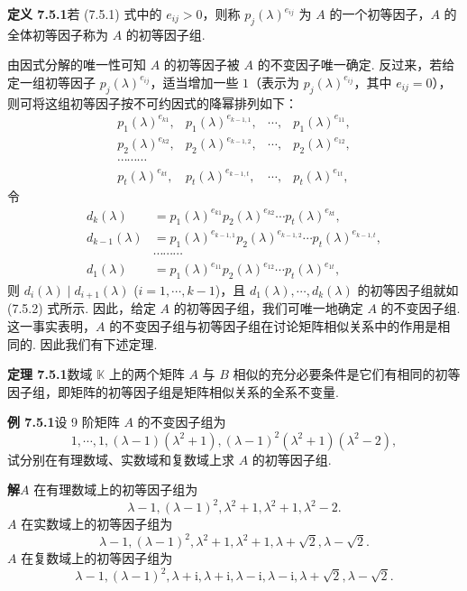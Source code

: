 \documentclass[UTF8,12pt,a4paper,fontset=fandol]{ctexart}
\begin{document}
\noindent\textbf{定义 7.5.1}\quad 若 (7.5.1) 式中的 $e_{ij}>0$，则称 $p_j(\lambda)^{e_{ij}}$ 为 $A$ 的一个初等因子，$A$ 的全体初等因子称为 $A$ 的初等因子组.

由因式分解的唯一性可知 $A$ 的初等因子被 $A$ 的不变因子唯一确定. 反过来，若给定一组初等因子 $p_j(\lambda)^{e_{ij}}$，适当增加一些 $1$（表示为 $p_j(\lambda)^{e_{ij}}$，其中 $e_{ij}=0$），则可将这组初等因子按不可约因式的降幂排列如下：
\begin{equation}
\begin{array}{cccc}
p_1(\lambda)^{e_{k1}}, & p_1(\lambda)^{e_{k-1,1}}, & \cdots, & p_1(\lambda)^{e_{11}},\\
p_2(\lambda)^{e_{k2}}, & p_2(\lambda)^{e_{k-1,2}}, & \cdots, & p_2(\lambda)^{e_{12}},\\
\cdots\cdots\cdots\\
p_t(\lambda)^{e_{kt}}, & p_t(\lambda)^{e_{k-1,t}}, & \cdots, & p_t(\lambda)^{e_{1t}},
\end{array}
\tag{7.5.2}
\end{equation}
令
\[
\begin{aligned}
d_k(\lambda)&=p_1(\lambda)^{e_{k1}}p_2(\lambda)^{e_{k2}}\cdots p_t(\lambda)^{e_{kt}},\\
d_{k-1}(\lambda)&=p_1(\lambda)^{e_{k-1,1}}p_2(\lambda)^{e_{k-1,2}}\cdots p_t(\lambda)^{e_{k-1,t}},\\
&\cdots\cdots\cdots\\
d_1(\lambda)&=p_1(\lambda)^{e_{11}}p_2(\lambda)^{e_{12}}\cdots p_t(\lambda)^{e_{1t}},
\end{aligned}
\]
则 $d_i(\lambda)\mid d_{i+1}(\lambda)$ ($i=1,\cdots,k-1$)，且 $d_1(\lambda),\cdots,d_k(\lambda)$ 的初等因子组就如 (7.5.2) 式所示. 因此，给定 $A$ 的初等因子组，我们可唯一地确定 $A$ 的不变因子组. 这一事实表明，$A$ 的不变因子组与初等因子组在讨论矩阵相似关系中的作用是相同的. 因此我们有下述定理.

\noindent\textbf{定理 7.5.1}\quad 数域 $\mathbb{K}$ 上的两个矩阵 $A$ 与 $B$ 相似的充分必要条件是它们有相同的初等因子组，即矩阵的初等因子组是矩阵相似关系的全系不变量.

\noindent\textbf{例 7.5.1}\quad 设 9 阶矩阵 $A$ 的不变因子组为
\[
1,\cdots,1,(\lambda-1)(\lambda^2+1),(\lambda-1)^2(\lambda^2+1)(\lambda^2-2),
\]
试分别在有理数域、实数域和复数域上求 $A$ 的初等因子组.

\noindent\textbf{解}\quad $A$ 在有理数域上的初等因子组为
\[
\lambda-1,(\lambda-1)^2,\lambda^2+1,\lambda^2+1,\lambda^2-2.
\]
$A$ 在实数域上的初等因子组为
\[
\lambda-1,(\lambda-1)^2,\lambda^2+1,\lambda^2+1,\lambda+\sqrt{2},\lambda-\sqrt{2}.
\]
$A$ 在复数域上的初等因子组为
\[
\lambda-1,(\lambda-1)^2,\lambda+\mathrm{i},\lambda+\mathrm{i},\lambda-\mathrm{i},\lambda-\mathrm{i},\lambda+\sqrt{2},\lambda-\sqrt{2}.
\]
\end{document}
